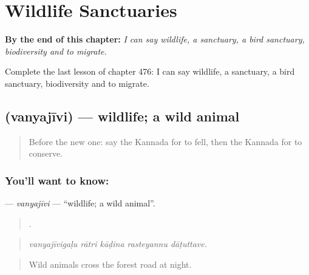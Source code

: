 
\chapter{Wildlife Sanctuaries}
\label{ch:ka-wildlife-sanctuaries}

\begin{chapteropening}
\textbf{By the end of this chapter:} \emph{I can say wildlife, a sanctuary, a bird sanctuary, biodiversity and to migrate.}

Complete the last lesson of chapter 476: I can say wildlife, a sanctuary, a bird sanctuary, biodiversity and to migrate.
\end{chapteropening}

\section[\texorpdfstring{\kn{ವನ್ಯಜೀವಿ} (vanyajīvi)}{ವನ್ಯಜೀವಿ (vanyajīvi)}]{ (vanyajīvi) — wildlife; a wild animal}

\label{lesson:KA-C476-vanyajivi}



\begin{quote}
Before the new one: say the Kannada for to fell, then the Kannada for to conserve.
\end{quote}

\subsection*{You'll want to know: }
\textbf{} — \emph{vanyajīvi} — \textquotedblleft{}wildlife; a wild animal\textquotedblright{}.

\begin{quote}
    .
\end{quote}

\begin{quote}
\emph{vanyajīvigaḷu rātri kāḍina rasteyannu dāṭuttave.}
\end{quote}

\begin{quote}
Wild animals cross the forest road at night.
\end{quote}

